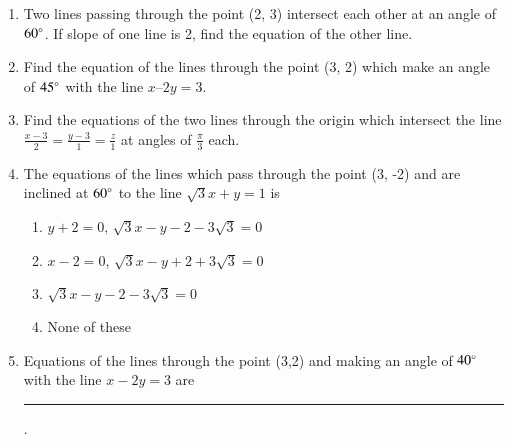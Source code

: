 \begin{enumerate}[label=\thesubsection.\arabic*,ref=\thesubsection.\theenumi]
	\item
 Two lines passing through the point (2, 3) intersect each other at an angle of $60\degree$. If slope of one line is 2, find the equation of the other line.
\label{chapters/11/10/3/12}
 \\
 \solution
		
\item Find the equation of the lines through the point (3, 2) which make an angle of $45\degree$  with the line $x – 2y = 3$.
\label{chapters/11/10/4/11}\\
\solution

\item Find the equations of the two lines through the origin which intersect the line $ \frac{x-3}{2}=\frac{y-3}{1}=\frac{z}{1}$ at angles of  $\frac{\pi}{3}$ each.
\item The equations of the lines which pass through the point (3, -2) and are inclined at $60\degree$ to the line $\sqrt{3} x+y=1$ is
\begin{enumerate}
\item $y+2=0$, $\sqrt{3}x-y-2-3\sqrt{3}=0$
\item $x-2=0$, $\sqrt{3}x-y+2+3\sqrt{3}=0$
\item $\sqrt{3}x-y-2-3\sqrt{3}=0$
\item None of these
\end{enumerate}
\item Equations of the lines through the point (3,2) and making an angle of $40\degree$ with the line $x-2y=3$ are \rule{1cm}{0.15mm}.   
\end{enumerate}
